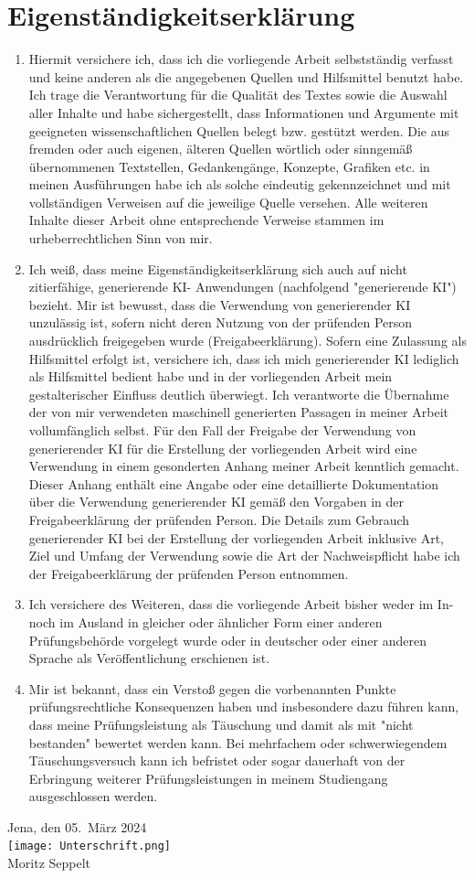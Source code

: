 \documentclass{report}
\theoremstyle{definition}
\begin{document}
\section*{Eigenständigkeitserklärung}
\begin{enumerate}
  \item Hiermit versichere ich, dass ich die vorliegende Arbeit selbstständig verfasst und keine
  anderen als die angegebenen Quellen und Hilfsmittel benutzt habe.
  Ich trage die Verantwortung für die Qualität des Textes sowie die Auswahl aller Inhalte und habe sichergestellt, dass Informationen und Argumente mit geeigneten wissenschaftlichen Quellen belegt bzw. gestützt werden. Die aus fremden oder auch eigenen, älteren Quellen wörtlich oder sinngemäß übernommenen Textstellen, Gedankengänge, Konzepte, Grafiken etc. in meinen Ausführungen habe ich als solche eindeutig gekennzeichnet und mit vollständigen Verweisen auf die jeweilige Quelle versehen. Alle weiteren Inhalte dieser Arbeit ohne entsprechende Verweise
  stammen im urheberrechtlichen Sinn von mir.
  \item Ich weiß, dass meine Eigenständigkeitserklärung sich auch auf nicht zitierfähige, generierende KI-
  Anwendungen (nachfolgend "generierende KI") bezieht.
  Mir ist bewusst, dass die Verwendung von generierender KI unzulässig ist, sofern nicht deren
  Nutzung von der prüfenden Person ausdrücklich freigegeben wurde (Freigabeerklärung). Sofern
  eine Zulassung als Hilfsmittel erfolgt ist, versichere ich, dass ich mich generierender KI lediglich als
  Hilfsmittel bedient habe und in der vorliegenden Arbeit mein gestalterischer Einfluss deutlich
  überwiegt. Ich verantworte die Übernahme der von mir verwendeten maschinell generierten
  Passagen in meiner Arbeit vollumfänglich selbst.
  Für den Fall der Freigabe der Verwendung von generierender KI für die Erstellung der vorliegenden
  Arbeit wird eine Verwendung in einem gesonderten Anhang meiner Arbeit kenntlich gemacht.
  Dieser Anhang enthält eine Angabe oder eine detaillierte Dokumentation über die Verwendung
  generierender KI gemäß den Vorgaben in der Freigabeerklärung der prüfenden Person.
  Die Details zum Gebrauch generierender KI bei der Erstellung der vorliegenden Arbeit inklusive Art,
  Ziel und Umfang der Verwendung sowie die Art der Nachweispflicht habe ich der Freigabeerklärung
  der prüfenden Person entnommen.
  \item Ich versichere des Weiteren, dass die vorliegende Arbeit bisher weder im In- noch im Ausland in
  gleicher oder ähnlicher Form einer anderen Prüfungsbehörde vorgelegt wurde oder in deutscher
  oder einer anderen Sprache als Veröffentlichung erschienen ist.
  \item Mir ist bekannt, dass ein Verstoß gegen die vorbenannten Punkte prüfungsrechtliche
  Konsequenzen haben und insbesondere dazu führen kann, dass meine Prüfungsleistung als
  Täuschung und damit als mit "nicht bestanden" bewertet werden kann. Bei mehrfachem oder
  schwerwiegendem Täuschungsversuch kann ich befristet oder sogar dauerhaft von der Erbringung
  weiterer Prüfungsleistungen in meinem Studiengang ausgeschlossen werden.
\end{enumerate}
\vspace{1cm}
Jena, den 05.\ März 2024
\vspace{0.5cm}\\
\texttt{[image: Unterschrift.png]}\\
Moritz Seppelt
\end{document}
